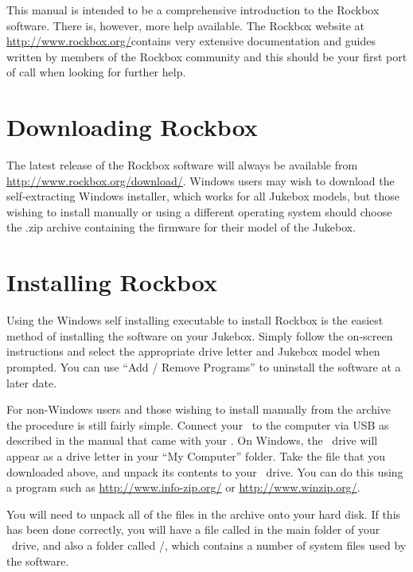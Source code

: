 This manual is intended to be a comprehensive introduction to the Rockbox
software.  There is, however, more help available.  The Rockbox website at
\url{http://www.rockbox.org/}contains very extensive documentation and guides
written by members of the Rockbox community and this should be your first port
of call when looking for further help.



\section{Downloading Rockbox}

The latest release of the Rockbox software will always be available from
\url{http://www.rockbox.org/download/}.
 Windows users may wish to download the self{}-extracting Windows
installer, which works for all Jukebox models, but those wishing to
install manually or using a different operating system should choose
the .zip archive containing the firmware for their model of the
Jukebox.

\section{Installing Rockbox}

Using the Windows self installing executable to install Rockbox is the easiest
method of installing the software on your Jukebox.  Simply follow the
on{}-screen instructions and select the appropriate drive letter and Jukebox
model when prompted.  You can use ``Add / Remove Programs'' to uninstall the
software at a later date.

For non{}-Windows users and those wishing to install manually from the archive
the procedure is still fairly simple.  Connect your \playername\ to the
computer via USB as described in the manual that came with your \playername. On
Windows, the \playername\ drive will appear as a drive letter in your
``My Computer'' folder. Take the file that you downloaded above, and unpack
its contents to your \playername\ drive. You can do this using a program such
as \url{http://www.info-zip.org/} or \url{http://www.winzip.org/}. 

You will need to unpack all of the files in the archive onto your hard
disk. If this has been done correctly, you will have a file called
in the main folder of your \playername\ drive, and also a folder called
/, which contains a number of system files used by the
software.

